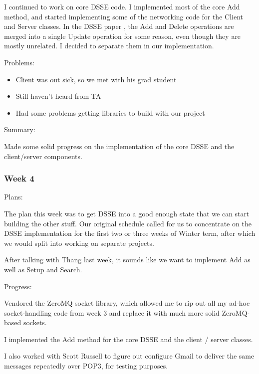 \documentclass[onecolumn, draftclsnofoot,10pt, compsoc]{IEEEtran}
\begin{document}
I continued to work on core DSSE code. I implemented most of the core Add method, and started implementing some of the networking code for the Client and Server classes. In the DSSE paper \cite{cash14}, the Add and Delete operations are merged into a single Update operation for some reason, even though they are mostly unrelated. I decided to separate them in our implementation.


\noindent Problems: 
\begin{itemize}
  \item Client was out sick, so we met with his grad student
  \item Still haven't heard from TA
  \item Had some problems getting libraries to build with our project
\end{itemize}

\noindent Summary:

Made some solid progress on the implementation of the core DSSE and the client/server components.

\subsubsection{Week 4} 

\noindent Plans: 

The plan this week was to get DSSE into a good enough state that we can start building the other stuff. Our original schedule called for us to concentrate on the DSSE implementation for the first two or three weeks of Winter term, after which we would split into working on separate projects.

After talking with Thang last week, it sounds like we want to implement Add as well as Setup and Search.

\noindent Progress: 

Vendored the ZeroMQ socket library, which allowed me to rip out all my ad-hoc socket-handling code from week 3 and replace it with much more solid ZeroMQ-based sockets.
 
I implemented the Add method for the core DSSE and the client / server classes.
 
I also worked with Scott Russell to figure out configure Gmail to deliver the same messages repeatedly over POP3, for testing purposes. 
\end{document}
